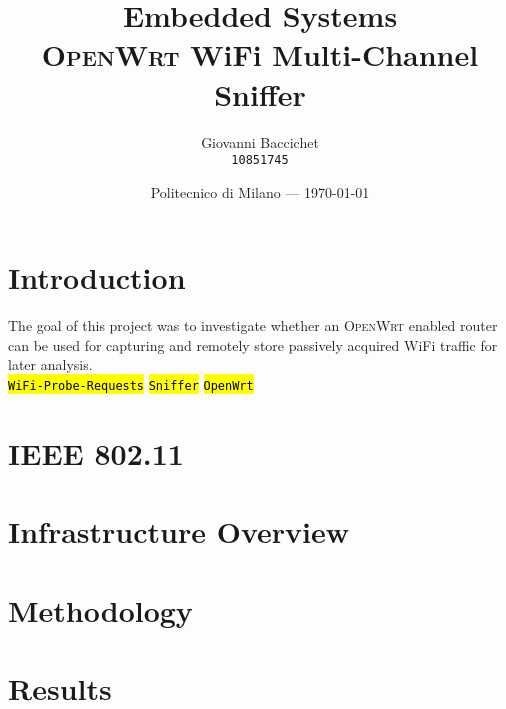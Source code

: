\documentclass{article}
\title{Embedded Systems \\ \textsc{OpenWrt} WiFi Multi-Channel Sniffer} %
\author{Giovanni Baccichet \\ \raisebox{0.1\height}{\fontsize{8}{8}\faUser} \texttt{10851745}} %
\date{Politecnico di Milano --- \today} %
\begin{document}
\maketitle %


\section{Introduction} %

The goal of this project was to investigate whether an \textsc{OpenWrt} enabled router can be used for capturing and remotely store passively acquired WiFi traffic for later analysis. \\

\raisebox{0.1\height}{\fontsize{8}{8}\faTags} \hl{\texttt{WiFi-Probe-Requests}} \hl{\texttt{Sniffer}} \hl{\texttt{OpenWrt}}



\section{IEEE 802.11}



\section{Infrastructure Overview}

\section{Methodology}


\section{Results}
 
\end{document}

